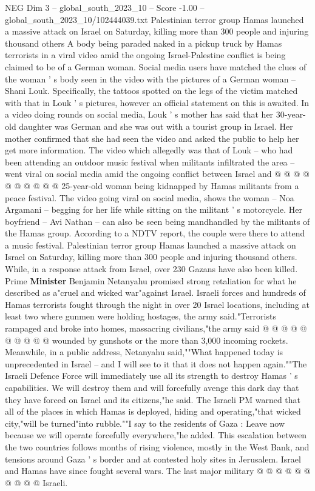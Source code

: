 \begin{textsample}{NEG Dim 3 – global\_south\_2023\_10 – Score -1.00 – global\_south\_2023\_10/102444039.txt}  \label{ex:f3_neg_028}
Palestinian terror group Hamas launched a massive attack on Israel on Saturday, killing more than 300 people and injuring thousand others A body being paraded naked in a pickup truck by Hamas terrorists in a viral video amid the ongoing Israel-Palestine conflict is being claimed to be of a German woman.
Social media users have matched the clues of the woman ' s body seen in the video with the pictures of a German woman -- Shani Louk.
Specifically, the tattoos spotted on the legs of the victim matched with that in Louk ' s pictures, however an official statement on this is awaited.
In a video doing rounds on social media, Louk ' s mother has said that her 30-year-old daughter was German and she was out with a tourist group in Israel.
Her mother confirmed that she had seen the video and asked the public to help her get more information.
The video which allegedly was that of Louk -- who had been attending an outdoor music festival when militants infiltrated the area -- went viral on social media amid the ongoing conflict between Israel and @ @ @ @ @ @ @ @ @ @ 25-year-old woman being kidnapped by Hamas militants from a peace festival.
The video going viral on social media, shows the woman -- Noa Argamani -- begging for her life while sitting on the militant ' s motorcycle.
Her boyfriend -- Avi Nathan -- can also be seen being mandhandled by the militants of the Hamas group.
According to a NDTV report, the couple were there to attend a music festival.
Palestinian terror group Hamas launched a massive attack on Israel on Saturday, killing more than 300 people and injuring thousand others.
While, in a response attack from Israel, over 230 Gazans have also been killed.
Prime \textbf{Minister} Benjamin Netanyahu promised strong retaliation for what he described as a"cruel and wicked war"against Israel.
Israeli forces and hundreds of Hamas terrorists fought through the night in over 20 Israel locations, including at least two where gunmen were holding hostages, the army said."Terrorists rampaged and broke into homes, massacring civilians,"the army said @ @ @ @ @ @ @ @ @ @ wounded by gunshots or the more than 3,000 incoming rockets.
Meanwhile, in a public address, Netanyahu said,""What happened today is unprecedented in Israel -- and I will see to it that it does not happen again.""The Israeli Defence Force will immediately use all its strength to destroy Hamas ' s capabilities.
We will destroy them and will forcefully avenge this dark day that they have forced on Israel and its citizens,"he said.
The Israeli PM warned that all of the places in which Hamas is deployed, hiding and operating,"that wicked city,"will be turned"into rubble.""I say to the residents of Gaza : Leave now because we will operate forcefully everywhere,"he added.
This escalation between the two countries follows months of rising violence, mostly in the West Bank, and tensions around Gaza ' s border and at contested holy sites in Jerusalem.
Israel and Hamas have since fought several wars.
The last major military @ @ @ @ @ @ @ @ @ @ Israeli.

\end{textsample}
